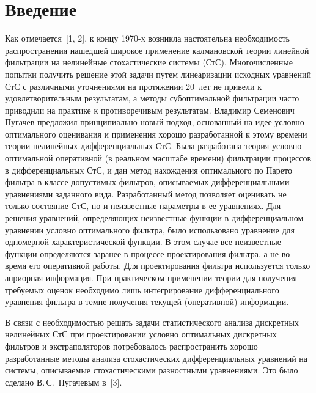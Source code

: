 
\thispagestyle{headings}

\begin{multicols}{2}


\label{st\stat}
\section{Введение}

Как отмечается~[1, 2], к концу 1970-х  возник\-ла настоятельна необходимость 
распространения нашедшей широкое применение калмановской тео\-рии линейной 
фильтрации на нелинейные сто\-хасти\-че\-ские системы (СтС). Многочисленные 
попыт\-ки получить решение этой задачи путем линеаризации исходных уравнений 
СтС с различными уточнениями на протяжении 20~лет не привели к 
удовлетворительным результатам, а методы субоптимальной фильтрации часто 
приводили на практике к противоречивым результатам. Владимир Семенович Пугачев 
предложил принципиально новый подход, основанный на идее условно оптимального 
оценивания и применения хорошо разработанной к этому времени теории нелинейных 
дифференциальных СтС. Была разработана тео\-рия условно оптимальной оперативной 
(в реальном  масштабе времени) фильтрации процессов в дифференциальных СтС, и 
дан метод нахождения оптимального по Парето фильтра в классе допустимых 
фильтров, описываемых дифференциальными уравнениями заданного вида. 
Разработанный метод позволяет оценивать не только состояние СтС, но и 
неизвестные параметры в ее уравнениях. Для решения уравнений, определяющих 
неизвестные функции в дифференциальном уравнении условно оптимального фильтра, 
было использовано уравнение для одномерной характеристической функции. В этом 
случае все неизвестные функции определяются заранее в процессе проектирования 
фильтра, а не во время его оперативной работы. Для проектирования фильтра 
используется только априорная информация. При практическом применении тео\-рии  
для получения требуемых оценок необходимо лишь интегрирование дифференциального 
уравнения фильтра в темпе получения текущей (оперативной) информации.

В связи с необходимостью решать задачи статистического анализа
дискретных нелинейных СтС при проектировании условно оптимальных
дискретных фильтров и экстраполяторов потребовалось распространить
хорошо  разработанные методы анализа стохастических
дифференциальных уравнений на системы, описываемые стохастическими
разностными уравнениями. Это было сделано В.\,С.~Пугачевым в~[3].


\end{multicols}
